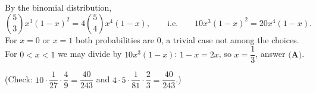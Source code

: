 By the binomial distribution,
\[\binom53x^3(1-x)^2=4\binom54x^4(1-x),\qquad\text{i.e.}\qquad 10x^3(1-x)^2=20x^4(1-x).\]
For $x=0$ or $x=1$ both probabilities are $0$, a trivial case not among the choices. For $0<x<1$ we may divide by $10x^3(1-x)$: $1-x=2x$, so $x=\boxed{\dfrac13}$, answer $\textbf{(A)}$.

(Check: $10\cdot\dfrac1{27}\cdot\dfrac49=\dfrac{40}{243}$ and $4\cdot5\cdot\dfrac1{81}\cdot\dfrac23=\dfrac{40}{243}$.)
